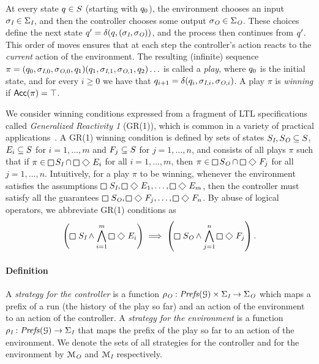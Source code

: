 At every state $q \in S$ (starting with
$q_0$), the environment chooses an input $\sigma_{\textit{I}} \in
\Sigma_{\textit{I}}$, and then the controller chooses some output $\sigma_{\textit{O}}
\in \Sigma_{\textit{O}}$. These choices define the next state $q' =
\delta(q,(\sigma_{\textit{I}}, \sigma_{\textit{O}}))$, and the process then continues from $q'$. This order of moves
ensures that at each step the controller's action reacts to the \emph{current}
action of the environment. The resulting
(infinite) sequence $\pi = (q_0,\sigma_{\textit{I},0},
\sigma_{\textit{O},0}, q_1) (q_1,\sigma_{\textit{I},1},
\sigma_{\textit{O},1}, q_2) \ldots$ is
called a \emph{play}, where $q_0$ is the initial state, and for every $i \geq 0$ we have that $q_{i+1} = \delta(q_i,\sigma_{\textit{I},i},\sigma_{\textit{O},i})$.  A play $\pi$ is \emph{winning} if $\mathsf{Acc}(\pi) = \top$. 


We consider winning conditions expressed from a fragment of LTL specifications called \emph{Generalized Reactivity 1} (GR(1)), which is common in a variety of practical applications~\cite{Moarref18,Alonso18,bh18,Maoz2015}.
A GR(1) winning condition is defined by sets of states $S_{\textit{I}}, S_{\textit{O}} \subseteq S$, $E_i \subseteq S$ for $i=1,\ldots,m$ and $F_j \subseteq S$ for $j=1,\ldots,n$, and consists of all plays $ \pi$ such that if $\pi \in \LTLglobally S_\inp \cap \LTLglobally\,\LTLfinally\, E_{i}$ for all $i=1,\ldots,m$, then $\pi \in \LTLglobally S_\out \cap \LTLglobally\,\LTLfinally\, F_{j}$ for all $j=1,\ldots,n$. Intuitively, for a play $ \pi$ to be winning, whenever the environment satisfies the assumptions $\LTLglobally\, S_\inp,\LTLglobally\,\LTLfinally\, E_{1},\ldots,\LTLglobally\,\LTLfinally\, E_{m}$, then the controller must satisfy all the guarantees $\LTLglobally\, S_\out,\LTLglobally\,\LTLfinally\, F_{j},\ldots,\LTLglobally\,\LTLfinally\, F_{n}$. By abuse of logical operators, we abbreviate GR(1)  conditions as
$$\left(\LTLglobally\, S_\inp \wedge \bigwedge_{i=1}^{m}  \LTLglobally\,\LTLfinally\, E_{i}\right) \implies
\left(\LTLglobally\, S_\out \wedge \bigwedge_{j=1}^{n} \LTLglobally\,\LTLfinally\,F_{j}\right).$$


\paragraph*{\textbf{Definition}}
%

A \emph{strategy for the controller} is a function $\rho_{\textit{O}}:
\mathit{Prefs}(\mathcal{G}) \times \Sigma_{\textit{I}} \rightarrow
\Sigma_{\textit{O}}$ which maps a prefix of a run (the history of the play so far) and an action of the environment to an action of the controller. 
A \emph{strategy for the environment} is a function $\rho_{\textit{I}}: \mathit{Prefs}(\mathcal{G})\rightarrow \Sigma_{\textit{I}}$ that maps the prefix of the play so far to an action of the environment. We denote the sets of all strategies for the controller and for the environment by $\mathcal{M}_{\textit{O}} $ and $\mathcal{M}_{\textit{I}}$ respectively.

